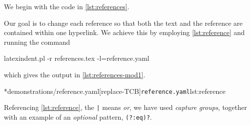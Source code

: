 	\begin{example}
		We begin with the code in \cref{lst:references}.


		Our goal is to change each reference so that both the text and the reference are contained within one hyperlink. We
		achieve this by employing \cref{lst:reference} and running the command
		\begin{commandshell}
latexindent.pl -r references.tex -l=reference.yaml
\end{commandshell}
		which gives the output in \cref{lst:references-mod1}.


		\cmhlistingsfromfile*[style=yaml-LST]*{demonstrations/reference.yaml}[replace-TCB]{\texttt{reference.yaml}}{lst:reference}

		Referencing \cref{lst:reference}, the \lstinline!|! means \emph{or}, we have used \emph{capture groups}, together with an example
		of an \emph{optional} pattern, \lstinline!(?:eq)?!.
	\end{example}
